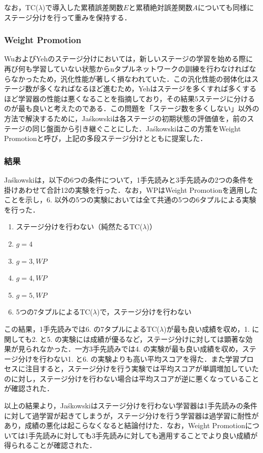 \documentclass{suribt}
\begin{document}
なお，TC(${\lambda}$)で導入した累積誤差関数$E$と累積絶対誤差関数$A$についても同様にステージ分けを行って重みを保持する．

\subsubsection{Weight Promotion}
WuおよびYehのステージ分けにおいては，新しいステージの学習を始める際に再び何も学習していない状態からnタプルネットワークの訓練を行わなければならなかったため，汎化性能が著しく損なわれていた．この汎化性能の弱体化はステージ数が多くなればなるほど進むため，Yehはステージを多くすれば多くするほど学習器の性能は悪くなることを指摘しており，その結果5ステージに分けるのが最も良いと考えたのである．この問題を「ステージ数を多くしない」以外の方法で解決するために，Ja\'{s}kowskiは各ステージの初期状態の評価値を，前のステージの同じ盤面から引き継ぐことにした．Ja\'{s}kowskiはこの方策をWeight Promotionと呼び，上記の多段ステージ分けとともに提案した．

\subsubsection{結果}
Ja\'{s}kowskiは，以下の6つの条件について，1手先読みと3手先読みの2つの条件を掛けあわせて合計12の実験を行った．なお，WPはWeight Promotionを適用したことを示し，6. 以外の5つの実験においては全て共通の5つの6タプルによる実験を行った．

\begin{enumerate}
\item ステージ分けを行わない（純然たるTC(${\lambda}$)）
\item $g=4$
\item $g=3, WP$
\item $g=4, WP$
\item $g=5, WP$
\item 5つの7タプルによるTC(${\lambda}$)で，ステージ分けを行わない
\end{enumerate}

この結果，1手先読みでは6. の7タプルによるTC(${\lambda}$)が最も良い成績を収め，1. に関しても2. と5. の実験には成績が優るなど，ステージ分けに対しては顕著な効果が見られなかった．一方3手先読みでは4. の実験が最も良い成績を収め，ステージ分けを行わない1. と6. の実験よりも高い平均スコアを得た．また学習プロセスに注目すると，ステージ分けを行う実験では平均スコアが単調増加していたのに対し，ステージ分けを行わない場合は平均スコアが逆に悪くなっていることが確認された．

以上の結果より，Ja\'{s}kowskiはステージ分けを行わない学習器は1手先読みの条件に対して過学習が起きてしまうが，ステージ分けを行う学習器は過学習に耐性があり，成績の悪化は起こらなくなると結論付けた．なお，Weight Promotionについては1手先読みに対しても3手先読みに対しても適用することでより良い成績が得られることが確認された．
\end{document}
